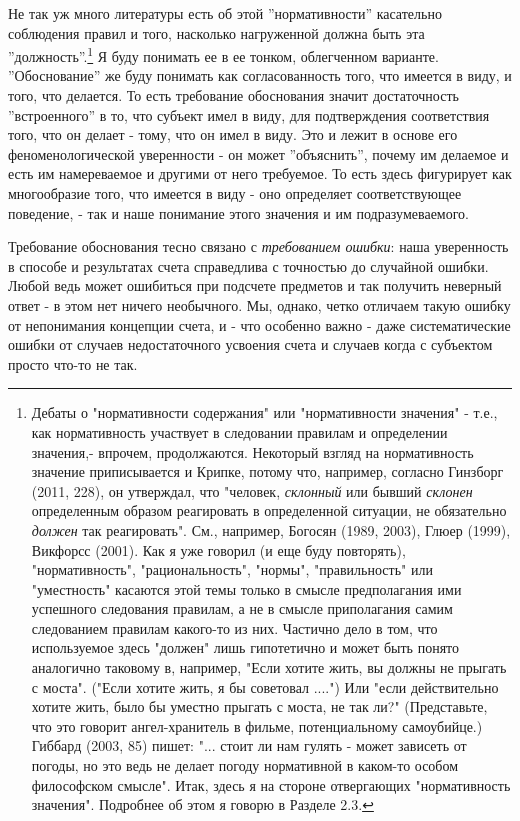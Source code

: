 \documentclass{book}
\begin{document}
Не так уж много литературы есть об этой ''нормативности'' касательно соблюдения правил и того, насколько нагруженной должна быть эта ''должность''.\footnote{Дебаты о "нормативности содержания" или "нормативности значения" - т.е., как нормативность участвует в следовании правилам и определении значения,- впрочем, продолжаются. Некоторый взгляд на нормативность значение приписывается и Крипке, потому что, например, согласно Гинзборг (2011, 228), он утверждал, что "человек, \textit{склонный} или бывший \textit{склонен} определенным образом реагировать в определенной ситуации, не обязательно \textit{должен} так реагировать". См., например, Богосян (1989, 2003), Глюер (1999), Викфорсс (2001). Как я уже говорил (и еще буду повторять), "нормативность", "рациональность", "нормы", "правильность" или "уместность" касаются этой темы только в смысле предполагания ими успешного следования правилам, а не в смысле приполагания самим следованием правилам какого-то из них. Частично дело в том, что используемое здесь "должен" лишь гипотетично и может быть понято аналогично таковому в, например, "Если хотите жить, вы должны не прыгать с моста". ("Если хотите жить, я бы советовал ....") Или "если действительно хотите жить, было бы уместно прыгать с моста, не так ли?" (Представьте, что это говорит ангел-хранитель в фильме, потенциальному самоубийце.) Гиббард (2003, 85) пишет: "... стоит ли нам гулять - может зависеть от погоды, но это ведь не делает погоду нормативной в каком-то особом философском смысле". Итак, здесь я на стороне отвергающих "нормативность значения". Подробнее об этом я говорю в Разделе 2.3.} Я буду понимать ее в ее тонком, облегченном варианте. ''Обоснование'' же буду понимать как согласованность того, что имеется в виду, и того, что делается. То есть требование обоснования значит достаточность ''встроенного'' в то, что субъект имел в виду, для подтверждения соответствия того, что он делает - тому, что он имел в виду. Это и лежит в основе его феноменологической уверенности - он может ''объяснить'', почему им делаемое и есть им намереваемое и другими от него требуемое. То есть здесь фигурирует как многообразие того, что имеется в виду - оно определяет соответствующее поведение, - так и наше понимание этого значения и им подразумеваемого.

Требование обоснования тесно связано с \textit{требованием ошибки}: наша уверенность в способе и результатах счета справедлива с точностью до случайной ошибки. Любой ведь может ошибиться при подсчете предметов и так получить неверный ответ - в этом нет ничего необычного. Мы, однако, четко отличаем такую ошибку от непонимания концепции счета, и - что особенно важно - даже систематические ошибки от случаев недостаточного усвоения счета и случаев когда с субъектом просто что-то не так.
\end{document}
